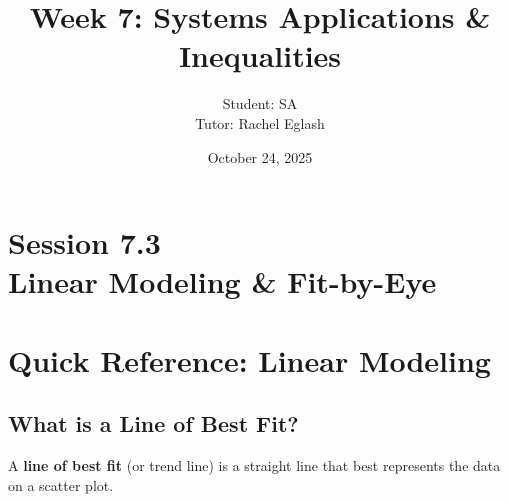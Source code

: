\documentclass[12pt]{article}
\title{Week 7: Systems Applications \& Inequalities}
\author{
	Student: SA\\
	Tutor: Rachel Eglash}
\date{October 24, 2025}
\begin{document}
	
	\maketitle

	\section*{Session 7.3 \\ Linear Modeling \& Fit-by-Eye}

		\newpage

	\section*{Quick Reference: Linear Modeling}

		\subsection*{What is a Line of Best Fit?}

			A \textbf{line of best fit} (or trend line) is a straight line that best represents the data on a scatter plot.
\end{document}
